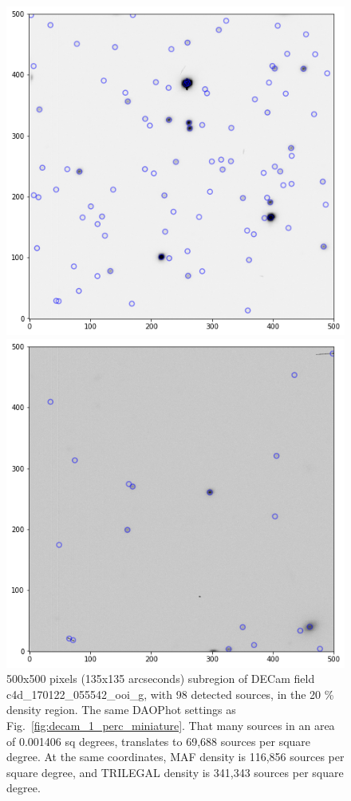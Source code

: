 \documentclass[DM,lsstdraft,toc,usenatbib]{lsstdoc}
\begin{document}
\begin{figure}
\begin{minipage}[t]{0.5\linewidth}
\includegraphics[width=\linewidth]{figs/c4d_170122_055542_ooi_g_v1_1_sub_500px.png}
\caption{500x500 pixels (135x135 arcseconds) subregion of DECam field c4d\_170122\_055542\_ooi\_g,  with 98  detected sources, in the  20 \% density region. The same DAOPhot settings as Fig.~\ref{fig:decam_1_perc_miniature}. That many sources in an area of 0.001406 sq degrees,  translates to 69,688 sources per square degree. At the same coordinates,  MAF density is  116,856 sources per square degree, and TRILEGAL density is 341,343 sources per square degree. }
\label{fig:decam_20_perc_miniature}
\end{minipage}
\hfill
\begin{minipage}[t]{0.5\linewidth}
\includegraphics[width=\linewidth]{figs/c4d_160607_025052_ooi_g_v1_1_sub_500px.png}

\end{minipage}
\end{figure}
\end{document}
